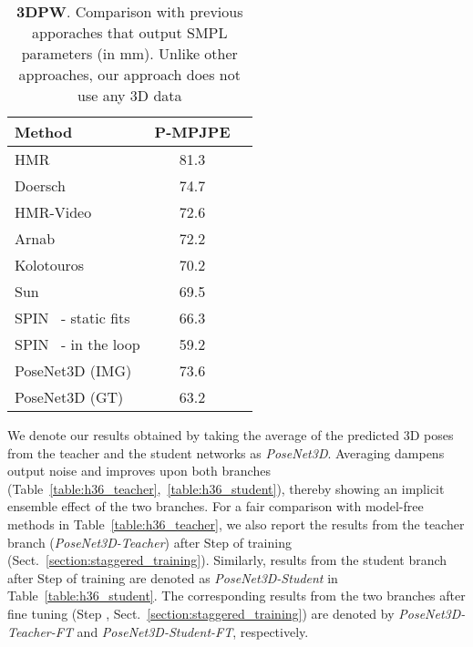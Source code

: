 \documentclass[10pt,twocolumn,letterpaper]{article}
\begin{document}
\begin{table}[tb!]
	\centering
	\small
	\begin{adjustbox}{max width=0.55\linewidth}
			\begin{tabular}{lcc}\toprule
			Method & P-MPJPE \\
			\midrule 
			HMR~\cite{kanazawa2018end}  & 81.3   \\
			Doersch~\etal~\cite{doersch2019sim2real}   &  74.7   \\
			HMR-Video~\cite{kanazawa2019learning}   & 72.6    \\
			Arnab~\etal~\cite{arnab2019exploiting} &  72.2   \\
			Kolotouros~\etal~\cite{kolotouros2019convolutional}   &  70.2   \\
			Sun~\etal~\cite{sun2019human}   &  69.5   \\
			SPIN~\cite{SPIN_ICCV2019} - static fits   &  66.3   \\
			SPIN~\cite{SPIN_ICCV2019} - in the loop  & 59.2 \\
			\midrule
			PoseNet3D (IMG) & 73.6 \\
			PoseNet3D (GT) & 63.2 \\
			\bottomrule
		\end{tabular}\end{adjustbox}
	\vspace{-1ex}
	\caption{\textbf{3DPW}.  Comparison with previous apporaches that output SMPL parameters (in mm). Unlike other approaches, our approach does not use any 3D data}
	\label{table:3dpw_results}
	\vspace{-2ex}
\end{table}
 We denote our results obtained by taking the average of the predicted 3D poses from the teacher and the student networks as \textit{PoseNet3D}. Averaging dampens output noise and improves upon both branches (Table~\ref{table:h36_teacher},~\ref{table:h36_student}), thereby showing an implicit ensemble effect of the two branches. For a fair comparison with model-free methods in Table~\ref{table:h36_teacher}, we also report the results from the teacher branch (\textit{PoseNet3D-Teacher}) after Step  of training (Sect.~\ref{section:staggered_training}). Similarly, results from the student branch after Step  of training are denoted as \textit{PoseNet3D-Student} in Table~\ref{table:h36_student}. The corresponding results from the two branches after fine tuning (Step , Sect.~\ref{section:staggered_training}) are denoted by \textit{PoseNet3D-Teacher-FT} and \textit{PoseNet3D-Student-FT}, respectively. 
\end{document}
